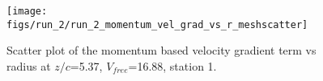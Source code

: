 \begin{figure}[H]
\centering
\texttt{[image: figs/run\_2/run\_2\_momentum\_vel\_grad\_vs\_r\_meshscatter]}
\caption{Scatter plot of the momentum based velocity gradient term vs radius at $z/c$=5.37, $V_{free}$=16.88, station 1.}
\label{fig:run_2_momentum_vel_grad_vs_r_meshscatter}
\end{figure}


